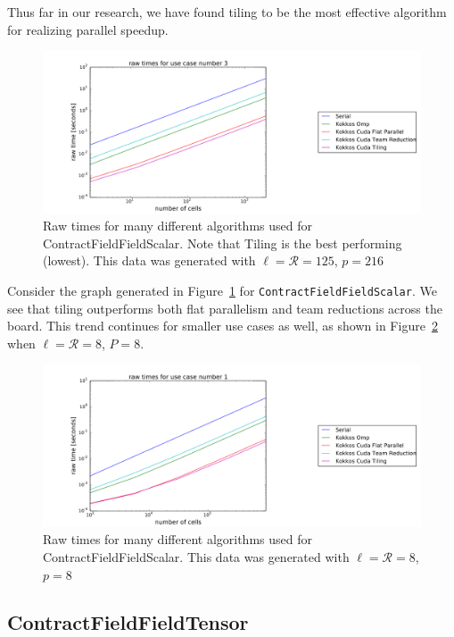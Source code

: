 Thus far in our research, we have found tiling to be the most effective
algorithm for realizing parallel speedup. 

\begin{figure}[H]
    \centering
\includegraphics[scale = .2]{tilinguc1}
\caption{Raw times for many different algorithms used for ContractFieldFieldScalar. Note that Tiling is the best performing (lowest). This data was generated with $\ell=\mathcal{R}=125$, $p=216$}
\label{fig:TilingPerformance}
\end{figure}
Consider the graph generated in Figure~\ref{fig:TilingPerformance} for \texttt{ContractFieldFieldScalar}. We see that tiling outperforms both flat parallelism and team reductions across the board. This trend continues for smaller use cases as well, as shown in Figure~\ref{fig:TilingPerformance2} when $\ell = \mathcal{R} = 8$, $P = 8$.

\begin{figure}[H]
    \centering
\includegraphics[scale = .2]{tilinguc2}
\caption{Raw times for many different algorithms used for ContractFieldFieldScalar. This data was generated with $\ell=\mathcal{R}=8$, $p=8$}
\label{fig:TilingPerformance2}
\end{figure}

\subsection{ContractFieldFieldTensor}

